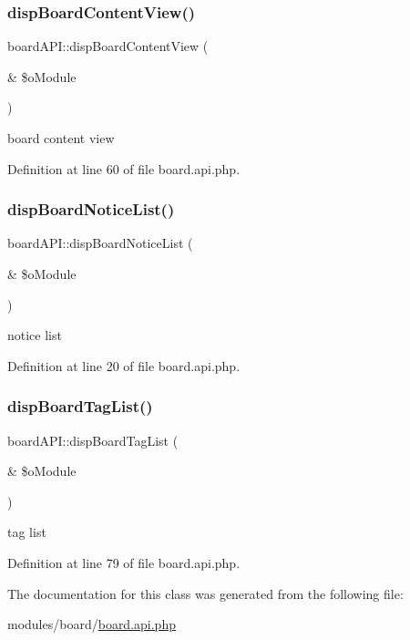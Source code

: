 \subsubsection{\texorpdfstring{disp\+Board\+Content\+View()}{dispBoardContentView()}}
{\footnotesize\ttfamily board\+A\+P\+I\+::disp\+Board\+Content\+View (\begin{DoxyParamCaption}\item[{\&}]{\$o\+Module }\end{DoxyParamCaption})}



board content view 



Definition at line 60 of file board.\+api.\+php.

\hypertarget{classboardAPI_a18395a2be76383d74317c1fcc1fb5830}{}\label{classboardAPI_a18395a2be76383d74317c1fcc1fb5830} 
\subsubsection{\texorpdfstring{disp\+Board\+Notice\+List()}{dispBoardNoticeList()}}
{\footnotesize\ttfamily board\+A\+P\+I\+::disp\+Board\+Notice\+List (\begin{DoxyParamCaption}\item[{\&}]{\$o\+Module }\end{DoxyParamCaption})}



notice list 



Definition at line 20 of file board.\+api.\+php.

\hypertarget{classboardAPI_af31d812495ea03d7a81c836463a56cad}{}\label{classboardAPI_af31d812495ea03d7a81c836463a56cad} 
\subsubsection{\texorpdfstring{disp\+Board\+Tag\+List()}{dispBoardTagList()}}
{\footnotesize\ttfamily board\+A\+P\+I\+::disp\+Board\+Tag\+List (\begin{DoxyParamCaption}\item[{\&}]{\$o\+Module }\end{DoxyParamCaption})}



tag list 



Definition at line 79 of file board.\+api.\+php.



The documentation for this class was generated from the following file\+:\begin{DoxyCompactItemize}
\item 
modules/board/\hyperlink{board_8api_8php}{board.\+api.\+php}\end{DoxyCompactItemize}
